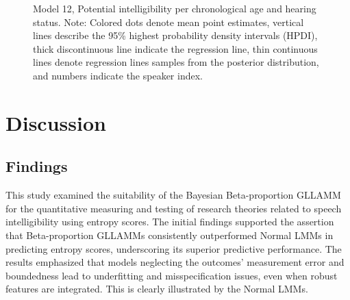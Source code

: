 \documentclass[
sn-apacite
]{sn-jnl}
\begin{document}
\label{cell-fig-rq3-intelligibility-model12}
\begin{figure}[H]


\caption{\label{fig-rq3-intelligibility-model12}Model 12, Potential
intelligibility per chronological age and hearing status. Note: Colored
dots denote mean point estimates, vertical lines describe the 95\%
highest probability density intervals (HPDI), thick discontinuous line
indicate the regression line, thin continuous lines denote regression
lines samples from the posterior distribution, and numbers indicate the
speaker index.}

\end{figure}%

\section{Discussion}\label{sec-discussion}

\subsection{Findings}\label{sec-D-F}

This study examined the suitability of the Bayesian Beta-proportion
GLLAMM for the quantitative measuring and testing of research theories
related to speech intelligibility using entropy scores. The initial
findings supported the assertion that Beta-proportion GLLAMMs
consistently outperformed Normal LMMs in predicting entropy scores,
underscoring its superior predictive performance. The results emphasized
that models neglecting the outcomes' measurement error and boundedness
lead to underfitting and misspecification issues, even when robust
features are integrated. This is clearly illustrated by the Normal LMMs.
\end{document}
